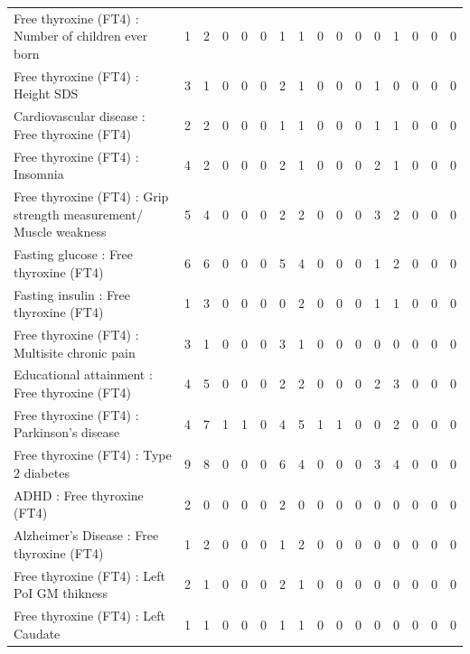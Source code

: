 \begin{table}[ht]
\begin{tabular}{lrrrrrrrrrrrrrrr}
  Free thyroxine (FT4) : Number of children ever born  &   1 &   2 &   0 &   0 &   0 &   1 &   1 &   0 &   0 &   0 &   0 &   1 &   0 &   0 &   0 \\ 
  Free thyroxine (FT4) : Height SDS &   3 &   1 &   0 &   0 &   0 &   2 &   1 &   0 &   0 &   0 &   1 &   0 &   0 &   0 &   0 \\ 
  Cardiovascular disease : Free thyroxine (FT4) &   2 &   2 &   0 &   0 &   0 &   1 &   1 &   0 &   0 &   0 &   1 &   1 &   0 &   0 &   0 \\ 
  Free thyroxine (FT4) : Insomnia &   4 &   2 &   0 &   0 &   0 &   2 &   1 &   0 &   0 &   0 &   2 &   1 &   0 &   0 &   0 \\ 
  Free thyroxine (FT4) : Grip strength measurement/ Muscle weakness &   5 &   4 &   0 &   0 &   0 &   2 &   2 &   0 &   0 &   0 &   3 &   2 &   0 &   0 &   0 \\ 
  Fasting glucose : Free thyroxine (FT4) &   6 &   6 &   0 &   0 &   0 &   5 &   4 &   0 &   0 &   0 &   1 &   2 &   0 &   0 &   0 \\ 
  Fasting insulin : Free thyroxine (FT4) &   1 &   3 &   0 &   0 &   0 &   0 &   2 &   0 &   0 &   0 &   1 &   1 &   0 &   0 &   0 \\ 
  Free thyroxine (FT4) : Multisite chronic pain &   3 &   1 &   0 &   0 &   0 &   3 &   1 &   0 &   0 &   0 &   0 &   0 &   0 &   0 &   0 \\ 
  Educational attainment : Free thyroxine (FT4) &   4 &   5 &   0 &   0 &   0 &   2 &   2 &   0 &   0 &   0 &   2 &   3 &   0 &   0 &   0 \\ 
  Free thyroxine (FT4) : Parkinson's disease &   4 &   7 &   1 &   1 &   0 &   4 &   5 &   1 &   1 &   0 &   0 &   2 &   0 &   0 &   0 \\ 
  Free thyroxine (FT4) : Type 2 diabetes &   9 &   8 &   0 &   0 &   0 &   6 &   4 &   0 &   0 &   0 &   3 &   4 &   0 &   0 &   0 \\ 
  ADHD : Free thyroxine (FT4) &   2 &   0 &   0 &   0 &   0 &   2 &   0 &   0 &   0 &   0 &   0 &   0 &   0 &   0 &   0 \\ 
  Alzheimer's Disease : Free thyroxine (FT4) &   1 &   2 &   0 &   0 &   0 &   1 &   2 &   0 &   0 &   0 &   0 &   0 &   0 &   0 &   0 \\ 
  Free thyroxine (FT4) : Left PoI GM thikness &   2 &   1 &   0 &   0 &   0 &   2 &   1 &   0 &   0 &   0 &   0 &   0 &   0 &   0 &   0 \\ 
  Free thyroxine (FT4) : Left Caudate &   1 &   1 &   0 &   0 &   0 &   1 &   1 &   0 &   0 &   0 &   0 &   0 &   0 &   0 &   0 \\ 

\end{tabular}
\end{table}
